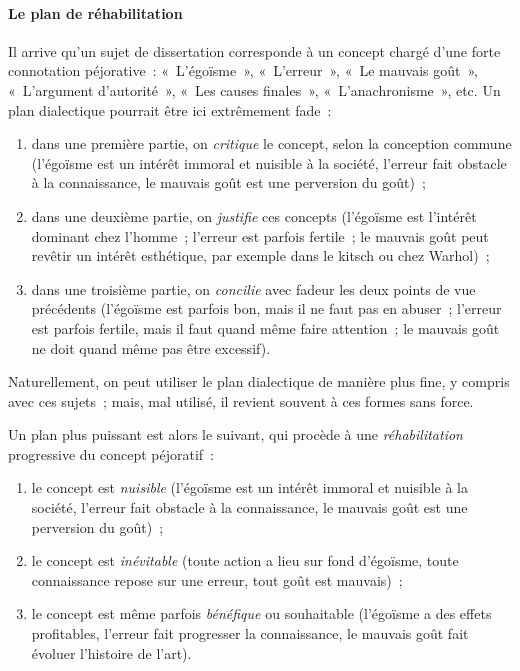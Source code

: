 \documentclass[a4paper]{article}
\begin{document}
\paragraph{Le plan de réhabilitation}
\label{sec-2-4-2-3}

Il arrive qu'un sujet de dissertation corresponde à un concept chargé
d'une forte connotation péjorative : « L'égoïsme », « L'erreur », « Le
mauvais goût », « L'argument d'autorité », « Les causes finales »,
« L'anachronisme », etc. Un plan dialectique pourrait être ici extrêmement
fade :

\begin{enumerate}
\item dans une première partie, on \emph{critique} le concept, selon la
conception commune (l'égoïsme est un intérêt immoral et nuisible à la
société, l'erreur fait obstacle à la connaissance, le mauvais goût
est une perversion du goût) ;

\item dans une deuxième partie, on \emph{justifie} ces concepts (l'égoïsme est
l'intérêt dominant chez l'homme ; l'erreur est parfois fertile ; le
mauvais goût peut revêtir un intérêt esthétique, par exemple dans le
kitsch ou chez Warhol) ;

\item dans une troisième partie, on \emph{concilie} avec fadeur les deux points
de vue précédents (l'égoïsme est parfois bon, mais il ne faut pas en
abuser ; l'erreur est parfois fertile, mais il faut quand même faire
attention ; le mauvais goût ne doit quand même pas être excessif).
\end{enumerate}

Naturellement, on peut utiliser le plan dialectique de manière plus
fine, y compris avec ces sujets ; mais, mal utilisé, il revient souvent
à ces formes sans force.

Un plan plus puissant est alors le suivant, qui procède à une
\emph{réhabilitation} progressive du concept péjoratif :

\begin{enumerate}
\item le concept est \emph{nuisible} (l'égoïsme est un intérêt immoral et
nuisible à la société, l'erreur fait obstacle à la connaissance, le
mauvais goût est une perversion du goût) ;

\item le concept est \emph{inévitable} (toute action a lieu sur fond d'égoïsme,
toute connaissance repose sur une erreur, tout goût est mauvais) ;

\item le concept est même parfois \emph{bénéfique} ou souhaitable (l'égoïsme a
des effets profitables, l'erreur fait progresser la connaissance, le
mauvais goût fait évoluer l'histoire de l'art).
\end{enumerate}
\end{document}
